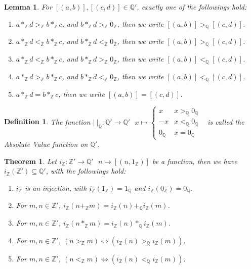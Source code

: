 \documentclass[11pt]{article}
\theoremstyle{break}
\theoremstyle{break}
\newtheorem{thm}{Theorem}[section]
\newtheorem{lem}{Lemma}[thm]
\newtheorem{defn}{Definition}[corL]
\newcommand{\Z}{\mathbb{Z}}
\newcommand{\Q}{\mathbb{Q}}
\begin{document}
	\begin{lem}
		For $[(a,b)],[(c,d)] \in \Q'$, exactly one of the followings hold:
		\begin{enumerate}[topsep=3pt,itemsep=-1ex,partopsep=1ex,parsep=1ex]
			\item $a \ast_{\Z} d >_{\Z} b \ast_{\Z} c$, and $b \ast_{\Z} d >_{\Z} 0_{\Z}$, then we write $[(a,b)] >_{\Q} [(c,d)]$.
			\item $a \ast_{\Z} d <_{\Z} b \ast_{\Z} c$, and $b \ast_{\Z} d <_{\Z} 0_{\Z}$, then we write $[(a,b)] >_{\Q} [(c,d)]$.
			\item $a \ast_{\Z} d <_{\Z} b \ast_{\Z} c$, and $b \ast_{\Z} d >_{\Z} 0_{\Z}$, then we write $[(a,b)] <_{\Q} [(c,d)]$.
			\item $a \ast_{\Z} d >_{\Z} b \ast_{\Z} c$, and $b \ast_{\Z} d <_{\Z} 0_{\Z}$, then we write $[(a,b)] <_{\Q} [(c,d)]$.
			\item $a \ast_{\Z} d = b \ast_{\Z} c$, then we write $[(a,b)]=[(c,d)]$.
		\end{enumerate}
	\end{lem}
	
	\begin{defn}
		The function $| \ |_{\Q} : \Q' \to \Q' \ \ \ x \mapsto \begin{cases} x & x >_{\Q} 0_{\Q} \\ -x & x<_{\Q} 0_{\Q} \\ 0_\Q & x=0_{\Q} \end{cases}$ \ is called the Absolute Value function on $\Q'$.
	\end{defn}
	
	\begin{thm}
		Let $i_{\Z}:\Z' \to \Q' \ \ \ n \mapsto [(n,1_{\Z})]$ be a function, then we have $i_{\Z}(\Z') \subseteq \Q'$, with the followings hold:
		\begin{enumerate}[topsep=3pt,itemsep=-1ex,partopsep=1ex,parsep=1ex]
			\item $i_{\Z}$ is an injection, with $i_{\Z}(1_{\Z})=1_{\Q}$ and $i_{\Z}(0_{\Z})=0_{\Q}$.
			\item For $m,n \in \Z'$, $i_{\Z}(n +_{\Z} m) = i_{\Z}(n) +_{\Q} i_{\Z}(m)$.
			\item For $m,n \in \Z'$, $i_{\Z}(n \ast_{\Z} m) = i_{\Z}(n) \ast_{\Q} i_{\Z}(m)$.
			\item For $m,n \in \Z'$, $(n >_{\Z} m)\iff(i_{\Z}(n) >_{\Q} i_{\Z}(m))$.
			\item For $m,n \in \Z'$, $(n <_{\Z} m)\iff(i_{\Z}(n) <_{\Q} i_{\Z}(m))$.
		\end{enumerate}
	\end{thm}
	
\end{document}
